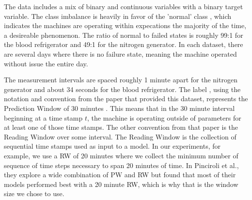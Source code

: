 \documentclass[12pt]{article}
\begin{document}
The data includes a mix of binary and continuous variables with a binary target variable. The class imbalance is heavily in
favor of the 'normal' class , which indicates the machines are operating within expecations the majority of the time,
a desireable phenomenon. The ratio of normal to failed states is roughly 99:1 for the blood refrigerator and 49:1 for the nitrogen
generator. In each dataset, there are several days where there is no failure state, meaning the machine operated without issue
the entire day.

The measurement intervals are spaced roughly 1 minute apart for the nitrogen generator and about 34 seconds for the blood refrigerator.
The label , using the notation and convention from the paper
that provided this dataset\cite{pinciroli_vago_predicting_2024}, represents the Prediction Window  of 30 minutes .
This means that in the 30 minute interval beginning at a time stamp $t$, the machine is operating outside of parameters for at least
one of those time stamps. The other convention from that paper is the Reading Window over some interval. The Reading Window  is
the collection of sequential time stamps used as input to a model. In our experiments, for example, we use a RW of 20 minutes where
we collect the minimum number of sequence of time steps necessary to span 20 minutes of time. In Pinciroli et al.\cite{pinciroli_vago_predicting_2024},
they explore a wide combination of PW and RW but found that most of their models performed best with a 20 minute RW, which is why
that is the window size we chose to use.
\end{document}
